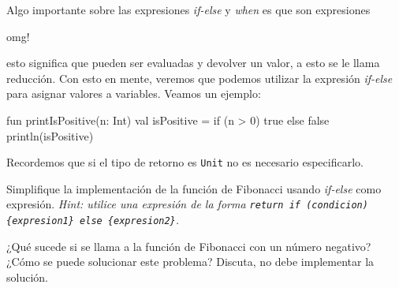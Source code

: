   Algo importante sobre las expresiones \textit{if-else} y \textit{when} es que son expresiones

  \begin{center}
    omg!
  \end{center}

  esto significa que pueden ser evaluadas y devolver un valor, a esto se le llama reducción.
  Con esto en mente, veremos que podemos utilizar la expresión \textit{if-else} para asignar
  valores a variables.
  Veamos un ejemplo:

  \begin{kotlin}
    fun printIsPositive(n: Int) {
      val isPositive = if (n > 0) {
        true
      } else {
        false
      }
      println(isPositive)
    }
  \end{kotlin}

  Recordemos que si el tipo de retorno es \texttt{Unit} no es necesario especificarlo.

  \begin{exercise}
    Simplifique la implementación de la función de Fibonacci usando \textit{if-else} como 
    expresión.
    \textit{Hint: utilice una expresión de la forma \texttt{return if (condicion) \{expresion1\} 
    else \{expresion2\}}.}
  \end{exercise}

  \begin{exercise}
    ¿Qué sucede si se llama a la función de Fibonacci con un número negativo?
    ¿Cómo se puede solucionar este problema?
    Discuta, no debe implementar la solución.
  \end{exercise}